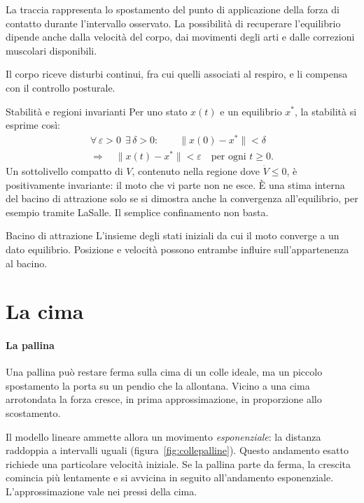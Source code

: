 \documentclass[11pt,a4paper,twoside=false,headinclude,footinclude]{scrartcl}
\begin{document}
La traccia rappresenta lo spostamento del punto di applicazione della forza di contatto durante l'intervallo osservato. La possibilità di recuperare l'equilibrio dipende anche dalla velocità del corpo, dai movimenti degli arti e dalle correzioni muscolari disponibili.

Il corpo riceve disturbi continui, fra cui quelli associati al respiro, e li compensa con il controllo posturale.

\begin{formule}{Stabilità e regioni invarianti}
Per uno stato $x(t)$ e un equilibrio $x^\ast$, la stabilità si esprime così:
\[
\begin{gathered}
\forall\,\varepsilon>0\ \ \exists\,\delta>0:\qquad
\lVert x(0)-x^\ast\rVert<\delta \\
\Longrightarrow\quad \lVert x(t)-x^\ast\rVert<\varepsilon
\quad \text{per ogni } t\ge 0 .
\end{gathered}
\]
Un sottolivello compatto di $V$, contenuto nella regione dove $\dot V\le0$, è positivamente invariante: il moto che vi parte non ne esce. È una stima interna del bacino di attrazione solo se si dimostra anche la convergenza all'equilibrio, per esempio tramite LaSalle. Il semplice confinamento non basta.
\end{formule}

\begin{parola}{Bacino di attrazione}
L'insieme degli stati iniziali da cui il moto converge a un dato equilibrio. Posizione e velocità possono entrambe influire sull'appartenenza al bacino.
\end{parola}

\section{La cima}\label{sec:cima}

\paragraph{La pallina} Una pallina può restare ferma sulla cima di un colle ideale, ma un piccolo spostamento la porta su un pendio che la allontana. Vicino a una cima arrotondata la forza cresce, in prima approssimazione, in proporzione allo scostamento.

Il modello lineare ammette allora un movimento \emph{esponenziale}: la distanza raddoppia a intervalli uguali (figura~\ref{fig:collepalline}). Questo andamento esatto richiede una particolare velocità iniziale. Se la pallina parte da ferma, la crescita comincia più lentamente e si avvicina in seguito all'andamento esponenziale. L'approssimazione vale nei pressi della cima.
\end{document}

